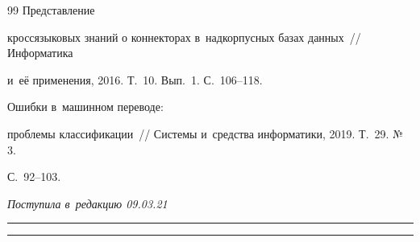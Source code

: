 {{\begin{thebibliography}{99}
 Представление 


кроссязыковых знаний о коннекторах в~надкорпусных базах данных~/\!\!/ Информатика 


и~её применения, 2016. Т.~10. Вып.~1. С.~106--118.




 Ошибки в~машинном переводе: 


проб\-ле\-мы классификации~/\!\!/ Сис\-те\-мы и~средства информатики, 2019. Т.~29. №\,3.  


С.~92--103.


      \end{thebibliography}


} }











\vspace*{-3pt}





\hfill{\small\textit{Поступила в~редакцию 09.03.21}}














\vspace*{6pt}





\hrule





\vspace*{2pt}















\hrule





\vspace*{8pt}





